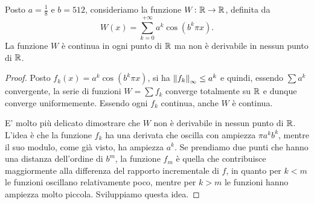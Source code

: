 \begin{example}
Posto $a=\frac 1 8$ e $b=512$, 
consideriamo la funzione $W\colon {\mathbb R} \to {\mathbb R}$, definita da
\[
   W(x) = \sum_{k=0}^{+\infty} a^k \cos(b^k \pi x).
\]
La funzione $W$ 
è continua in ogni punto di ${\mathbb R}$ 
ma non è derivabile in nessun punto di ${\mathbb R}$.
\end{example}
\begin{proof}
Posto $f_k(x) = a^k \cos(b^k \pi x)$,
si ha ${\left\Vert f_k\right\Vert}_{\infty} \leq a^k$ e quindi, essendo $\sum a^k$ convergente, 
la serie di funzioni $W = \sum f_k$
converge totalmente su ${\mathbb R}$ e dunque converge uniformemente.
Essendo ogni $f_k$ continua, anche $W$ è continua.

E' molto più delicato dimostrare che $W$ non è derivabile in nessun punto di ${\mathbb R}$.
L'idea è che la funzione $f_k$ ha una derivata 
che oscilla con ampiezza $\pi a^k b^k$, mentre il suo modulo, come già visto,
ha ampiezza $a^k$. 
Se prendiamo due punti che hanno una distanza dell'ordine di $b^m$,
la funzione $f_m$ è quella che contribuisce maggiormente alla differenza 
del rapporto incrementale di $f$, in quanto per $k<m$ le funzioni oscillano relativamente 
poco, mentre per $k>m$ le funzioni hanno ampiezza molto piccola.
Sviluppiamo questa idea.


\end{proof}
